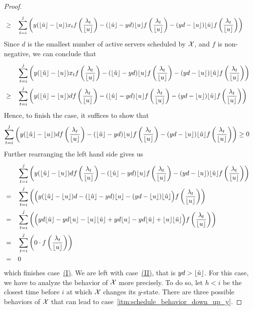\begin{proof}
\begin{align*}
	&\ge&&\sum\limits_{t=i}^j\left(y(\lfloor\hat{u}\rfloor-\lfloor u\rfloor)x_tf\left(\frac{\lambda_t}{\lfloor u\rfloor}\right)-(\lfloor\hat{u}\rfloor-yd)\lfloor u\rfloor f\left(\frac{\lambda_t}{\lfloor u\rfloor}\right)-(yd-\lfloor u\rfloor)\lfloor\hat{u}\rfloor f\left(\frac{\lambda_t}{\lfloor u\rfloor}\right)\right)
\end{align*}
Since $d$ is the smallest number of active servers scheduled by $\mathcal{X}$, and $f$ is non-negative, we can conclude that
\begin{align*}
	&&&\sum\limits_{t=i}^j\left(y(\floor{\hat{u}}-\floor{u})x_tf\left(\frac{\lambda_t}{\floor{u}}\right)-(\floor{\hat{u}}-yd)\floor{u}f\left(\frac{\lambda_t}{\floor{u}}\right)-(yd-\floor{u})\floor{\hat{u}}f\left(\frac{\lambda_t}{\floor{u}}\right)\right)\\
	&\ge&&\sum\limits_{t=i}^j\left(y(\floor{\hat{u}}-\floor{u})d\*f\left(\frac{\lambda_t}{\floor{u}}\right)-(\floor{\hat{u}}-yd)\floor{u}f\left(\frac{\lambda_t}{\floor{u}}\right)-(yd-\floor{u})\floor{\hat{u}}f\left(\frac{\lambda_t}{\floor{u}}\right)\right)
\end{align*}
Hence, to finish the case, it suffices to show that
\begin{align*}
	\sum\limits_{t=i}^j\left(y(\floor{\hat{u}}-\floor{u})d\*f\left(\frac{\lambda_t}{\floor{u}}\right)-(\floor{\hat{u}}-yd)\floor{u}f\left(\frac{\lambda_t}{\floor{u}}\right)-(yd-\floor{u})\floor{\hat{u}}f\left(\frac{\lambda_t}{\floor{u}}\right)\right)\ge 0
\end{align*}
Further rearranging the left hand side gives us
\begin{align*}
	&&&\sum\limits_{t=i}^j\left(y(\floor{\hat{u}}-\floor{u})d\*f\left(\frac{\lambda_t}{\floor{u}}\right)-(\floor{\hat{u}}-yd)\floor{u}f\left(\frac{\lambda_t}{\floor{u}}\right)-(yd-\floor{u})\floor{\hat{u}}f\left(\frac{\lambda_t}{\floor{u}}\right)\right)\\
	&=&&\sum\limits_{t=i}^j\left(\Bigl(y(\floor{\hat{u}}-\floor{u})d-(\floor{\hat{u}}-yd)\floor{u}-(yd-\floor{u})\floor{\hat{u}}\Bigr)f\left(\frac{\lambda_t}{\floor{u}}\right)\right)\\
	&=&&\sum\limits_{t=i}^j\left(\Bigl(yd\floor{\hat{u}}-yd\floor{u}-\floor{u}\floor{\hat{u}}+yd\floor{u}-yd\floor{\hat{u}}+\floor{u}\floor{\hat{u}}\Bigr)f\left(\frac{\lambda_t}{\floor{u}}\right)\right)\\
	&=&&\sum\limits_{t=i}^j\left(0\cdot f\left(\frac{\lambda_t}{\floor{u}}\right)\right)\\
	&=&&0
\end{align*}
which finishes case~\hyperref[itm:schedule_behavior_down_up_y_subcases_I]{(I)}. We are left with case~\hyperref[itm:schedule_behavior_down_up_y_subcases_I]{(II)}, that is $yd>\lfloor\hat{u}\rfloor$. For this case, we have to analyze the behavior of $\mathcal{X}$ more precisely. To do so, let $h<i$ be the closest time before $i$ at which $\mathcal{X}$ changes its $y$-state. There are three possible behaviors of $\mathcal{X}$ that can lead to case~\ref{itm:schedule_behavior_down_up_y}.


\end{proof}
